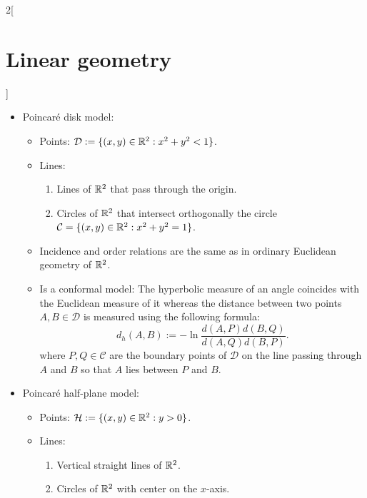 \documentclass[../../../main.tex]{subfiles}
\begin{document}
\begin{multicols}{2}[\section{Linear geometry}]
\begin{definition}
\begin{itemize}
\begin{center}
            \end{center}
      \item Poincaré disk model:
            \begin{itemize}
              \item Points: $\mathcal{D}:=\{(x,y)\in\mathbb{R}^2:x^2+y^2<1\}$.
              \item Lines:
                    \begin{enumerate}
                      \item Lines of $\mathbb{R}^2$ that pass through the origin.
                      \item Circles of $\mathbb{R}^2$ that intersect orthogonally the circle $\mathcal{C}=\{(x,y)\in\mathbb{R}^2:x^2+y^2=1\}$.
                    \end{enumerate}
              \item Incidence and order relations are the same as in ordinary Euclidean geometry of $\mathbb{R}^2$.
              \item Is a conformal model: The hyperbolic measure of an angle coincides with the Euclidean measure of it whereas the distance between two points $A,B\in\mathcal{D}$ is measured using the following formula: $$d_h(A,B):=-\ln\frac{d(A,P)d(B,Q)}{d(A,Q)d(B,P)}.$$ where $P,Q\in\mathcal{C}$ are the boundary points of $\mathcal{D}$ on the line passing through $A$ and $B$ so that $A$ lies between $P$ and $B$.
            \end{itemize}
            \begin{center}
              \begin{minipage}{\linewidth}
                \centering
                
              \end{minipage}
            \end{center}
      \item Poincaré half-plane model:
            \begin{itemize}
              \item Points: $\mathcal{H}:=\{(x,y)\in\mathbb{R}^2:y>0\}$.
              \item Lines:
                    \begin{enumerate}
                      \item Vertical straight lines of $\mathbb{R}^2$.
                      \item Circles of $\mathbb{R}^2$ with center on the $x$-axis.
                    \end{enumerate}

\end{itemize}
\end{itemize}
\end{definition}
\end{multicols}
\end{document}
